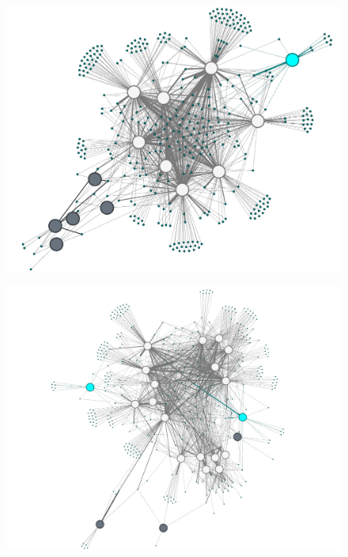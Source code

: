 \begin{landscape}
\begin{figure}
\begin{center}
\begin{minipage}[t]{0.40\textwidth}
\end{minipage}
\begin{minipage}[t]{0.40\textwidth}
\includegraphics[width=\textwidth]{./img/acido.png}
\label{figacido}
\end{minipage}
\begin{minipage}[t]{0.40\textwidth}
\includegraphics[width=\textwidth]{./img/chloroflex.png}
\label{chloro}
\end{minipage}
\\
\vspace{0.2cm}
\begin{minipage}[t]{0.40\textwidth}

\end{minipage}
\end{center}
\end{figure}
\end{landscape}
